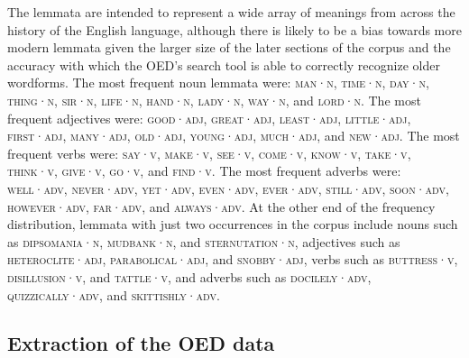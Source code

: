 \documentclass[doc,biblatex]{apa7}
\newcommand\lemma[2]{\textsc{#1·#2}}
\begin{document}
The lemmata are intended to represent a wide array of meanings from across the history of the English language, although there is likely to be a bias towards more modern lemmata given the larger size of the later sections of the corpus and the accuracy with which the OED's search tool is able to correctly recognize older wordforms. The most frequent noun lemmata were: \lemma{man}{n}, \lemma{time}{n}, \lemma{day}{n}, \lemma{thing}{n}, \lemma{sir}{n}, \lemma{life}{n}, \lemma{hand}{n}, \lemma{lady}{n}, \lemma{way}{n}, and \lemma{lord}{n}. The most frequent adjectives were: \lemma{good}{adj}, \lemma{great}{adj}, \lemma{least}{adj}, \lemma{little}{adj}, \lemma{first}{adj}, \lemma{many}{adj}, \lemma{old}{adj}, \lemma{young}{adj}, \lemma{much}{adj}, and \lemma{new}{adj}. The most frequent verbs were: \lemma{say}{v}, \lemma{make}{v}, \lemma{see}{v}, \lemma{come}{v}, \lemma{know}{v}, \lemma{take}{v}, \lemma{think}{v}, \lemma{give}{v}, \lemma{go}{v}, and \lemma{find}{v}. The most frequent adverbs were: \lemma{well}{adv}, \lemma{never}{adv}, \lemma{yet}{adv}, \lemma{even}{adv}, \lemma{ever}{adv}, \lemma{still}{adv}, \lemma{soon}{adv}, \lemma{however}{adv}, \lemma{far}{adv}, and \lemma{always}{adv}. At the other end of the frequency distribution, lemmata with just two occurrences in the corpus include nouns such as \lemma{dipsomania}{n}, \lemma{mudbank}{n}, and \lemma{sternutation}{n}, adjectives such as \lemma{heteroclite}{adj}, \lemma{parabolical}{adj}, and \lemma{snobby}{adj}, verbs such as \lemma{buttress}{v}, \lemma{disillusion}{v}, and \lemma{tattle}{v}, and adverbs such as \lemma{docilely}{adv}, \lemma{quizzically}{adv}, and \lemma{skittishly}{adv}.

\subsection{Extraction of the OED data}
\end{document}
